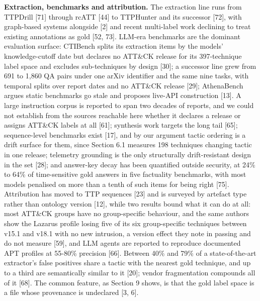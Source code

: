 \documentclass[11pt,a4paper]{article}
\begin{document}
\textbf{Extraction, benchmarks and attribution.} The extraction line runs from TTPDrill [71] through rcATT [44] to TTPHunter and its successor [72], with graph-based systems alongside [2] and recent multi-label work declining to treat existing annotations as gold [52, 73]. LLM-era benchmarks are the dominant evaluation surface: CTIBench splits its extraction items by the models' knowledge-cutoff date but declares no ATT\&CK release for its 397-technique label space and excludes sub-techniques by design [30]; a successor line grew from 691 to 1,860 QA pairs under one arXiv identifier and the same nine tasks, with temporal splits over report dates and no ATT\&CK release [29]; AthenaBench argues static benchmarks go stale and proposes live-API construction [13]. A large instruction corpus is reported to span two decades of reports, and we could not establish from the sources reachable here whether it declares a release or assigns ATT\&CK labels at all [61]; synthesis work targets the long tail [65]; sequence-level benchmarks exist [17], and by our argument tactic ordering is a drift surface for them, since Section 6.1 measures 198 techniques changing tactic in one release; telemetry grounding is the only structurally drift-resistant design in the set [28]; and answer-key decay has been quantified outside security, at 24\% to 64\% of time-sensitive gold answers in five factuality benchmarks, with most models penalised on more than a tenth of such items for being right [75]. Attribution has moved to TTP sequences [23] and is surveyed by artefact type rather than ontology version [12], while two results bound what it can do at all: most ATT\&CK groups have no group-specific behaviour, and the same authors show the Lazarus profile losing five of its six group-specific techniques between v15.1 and v18.1 with no new intrusion, a version effect they note in passing and do not measure [59], and LLM agents are reported to reproduce documented APT profiles at 55-80\% precision [66]. Between 40\% and 79\% of a state-of-the-art extractor's false positives share a tactic with the nearest gold technique, and up to a third are semantically similar to it [20]; vendor fragmentation compounds all of it [68]. The common feature, as Section 9 shows, is that the gold label space is a file whose provenance is undeclared [3, 6].
\end{document}
